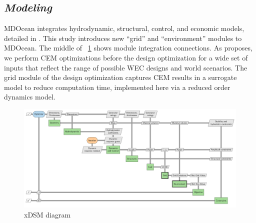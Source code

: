 \documentclass[10pt,twoside]{article}
\newif\ifplaceholder
\let\originalincludegraphics\includegraphics
\renewcommand{\includegraphics}[2][]{%
  \ifplaceholder
    \begin{tikzpicture}
      \node[anchor=south west, inner sep=0] (img) at (0,0) {\originalincludegraphics[#1]{#2}};
      \node at ($(img.south east)!0.5!(img.north west)$)
        [fill=white,opacity=0.8,text=red,font=\huge] {Placeholder};
    \end{tikzpicture}
    \vspace{-\baselineskip}
  \else
    \originalincludegraphics[#1]{#2}%
  \fi
  \placeholderfalse %
}
\begin{document}
\subsection{\textit{Modeling}}
MDOcean integrates hydrodynamic, structural, control, and economic models, detailed in \cite{mccabe_leveraging_2025}.
This study introduces new ``grid'' and ``environment'' modules to MDOcean.
The middle of \figureautorefname~\ref{fig:n2} shows module integration connections.
As \cite{mccabe_system_2023} proposes, we perform CEM optimizations before the design optimization for a wide set of inputs that reflect the range of possible WEC designs and world scenarios. The grid module of the design optimization captures CEM results in a surrogate model to reduce computation time, implemented here via a reduced order dynamics model.
\begin{figure}[hbtp]
    \centering
    \includegraphics[width=.83\textwidth]{figures/out/xdsm_grid.pdf}
    \caption{xDSM diagram}
    \label{fig:n2}
\end{figure}

\clearpage
\end{document}
